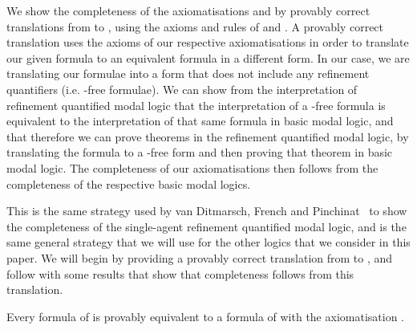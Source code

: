 We show the completeness of the axiomatisations \axiomSiF{} and \axiomKDiF{} by
provably correct translations from \langFi{} to \langi{}, using the axioms and
rules of \axiomSiF{} and \axiomKDiF{}. A provably correct translation uses the
axioms of our respective axiomatisations in order to translate our given formula
to an equivalent formula in a different form. In our case, we are translating
our formulae into a form that does not include any refinement quantifiers (i.e.
\somerefs{}-free formulae). We can show from the interpretation of refinement
quantified modal logic that the interpretation of a \somerefs{}-free formula is
equivalent to the interpretation of that same formula in basic modal logic, and
that therefore we can prove theorems in the refinement quantified modal logic,
by translating the formula to a \somerefs{}-free form and then proving that
theorem in basic modal logic. The completeness of our axiomatisations then
follows from the completeness of the respective basic modal logics. 

This is the same strategy used by van Ditmarsch, French and
Pinchinat~\cite{french2010future} to show the completeness of the single-agent
refinement quantified modal logic, and is the same general strategy that we will
use for the other logics that we consider in this paper. We will begin by
providing a provably correct translation from \langFi{} to \langi{}, and follow
with some results that show that completeness follows from this translation.

\begin{lemma}\label{single-reduction-s5}
Every formula of \langFi{} is provably equivalent to a formula of \langi{} with
the axiomatisation \axiomSiF{}.
\end{lemma}

